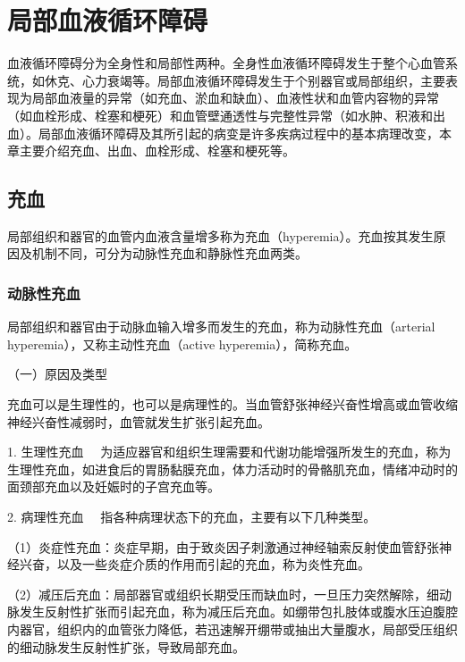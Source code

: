 
\chapter{局部血液循环障碍}


血液循环障碍分为全身性和局部性两种。全身性血液循环障碍发生于整个心血管系统，如休克、心力衰竭等。局部血液循环障碍发生于个别器官或局部组织，主要表现为局部血液量的异常（如充血、淤血和缺血）、血液性状和血管内容物的异常（如血栓形成、栓塞和梗死）和血管壁通透性与完整性异常（如水肿、积液和出血）。局部血液循环障碍及其所引起的病变是许多疾病过程中的基本病理改变，本章主要介绍充血、出血、血栓形成、栓塞和梗死等。
\section{充血}

局部组织和器官的血管内血液含量增多称为充血（hyperemia）。充血按其发生原因及机制不同，可分为动脉性充血和静脉性充血两类。

\subsection{动脉性充血}

局部组织和器官由于动脉血输入增多而发生的充血，称为动脉性充血（arterial
hyperemia），又称主动性充血（active hyperemia），简称充血。

{（一）原因及类型}

充血可以是生理性的，也可以是病理性的。当血管舒张神经兴奋性增高或血管收缩神经兴奋性减弱时，血管就发生扩张引起充血。

{1. 生理性充血}
　为适应器官和组织生理需要和代谢功能增强所发生的充血，称为生理性充血，如进食后的胃肠黏膜充血，体力活动时的骨骼肌充血，情绪冲动时的面颈部充血以及妊娠时的子宫充血等。

{2. 病理性充血} 　指各种病理状态下的充血，主要有以下几种类型。

（1）炎症性充血：炎症早期，由于致炎因子刺激通过神经轴索反射使血管舒张神经兴奋，以及一些炎症介质的作用而引起的充血，称为炎性充血。

（2）减压后充血：局部器官或组织长期受压而缺血时，一旦压力突然解除，细动脉发生反射性扩张而引起充血，称为减压后充血。如绷带包扎肢体或腹水压迫腹腔内器官，组织内的血管张力降低，若迅速解开绷带或抽出大量腹水，局部受压组织的细动脉发生反射性扩张，导致局部充血。

